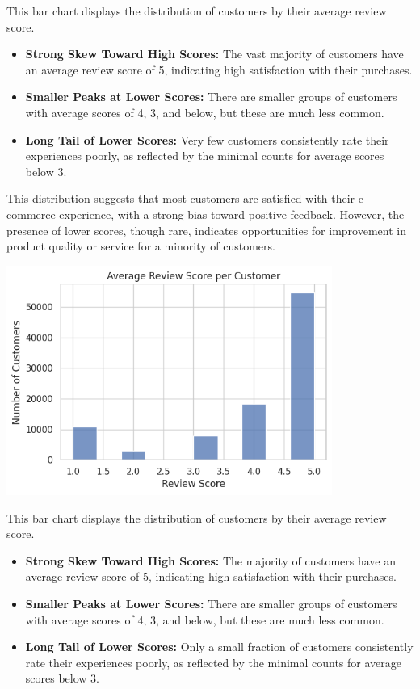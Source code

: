 \documentclass[a4paper]{article}
\begin{document}
\begin{multicols}{2}
This bar chart displays the distribution of customers by their average review score.

    \begin{itemize}
        \item \textbf{Strong Skew Toward High Scores:} The vast majority of customers have an average review score of 5, indicating high satisfaction with their purchases.
        \item \textbf{Smaller Peaks at Lower Scores:} There are smaller groups of customers with average scores of 4, 3, and below, but these are much less common.
        \item \textbf{Long Tail of Lower Scores:} Very few customers consistently rate their experiences poorly, as reflected by the minimal counts for average scores below 3.
    \end{itemize}

    This distribution suggests that most customers are satisfied with their e-commerce experience, with a strong bias toward positive feedback. However, the presence of lower scores, though rare, indicates opportunities for improvement in product quality or service for a minority of customers.


\noindent
\begin{minipage}{\columnwidth}
\centering
\includegraphics[width=0.8\textwidth]{plots/Average Review Score per Customer.png}
\label{fig:avg_review_score_per_customer} 
\end{minipage}

This bar chart displays the distribution of customers by their average review score.

\begin{itemize}
    \item \textbf{Strong Skew Toward High Scores:} The majority of customers have an average review score of 5, indicating high satisfaction with their purchases.
    \item \textbf{Smaller Peaks at Lower Scores:} There are smaller groups of customers with average scores of 4, 3, and below, but these are much less common.
    \item \textbf{Long Tail of Lower Scores:} Only a small fraction of customers consistently rate their experiences poorly, as reflected by the minimal counts for average scores below 3.
\end{itemize}


\end{multicols}
\end{document}
